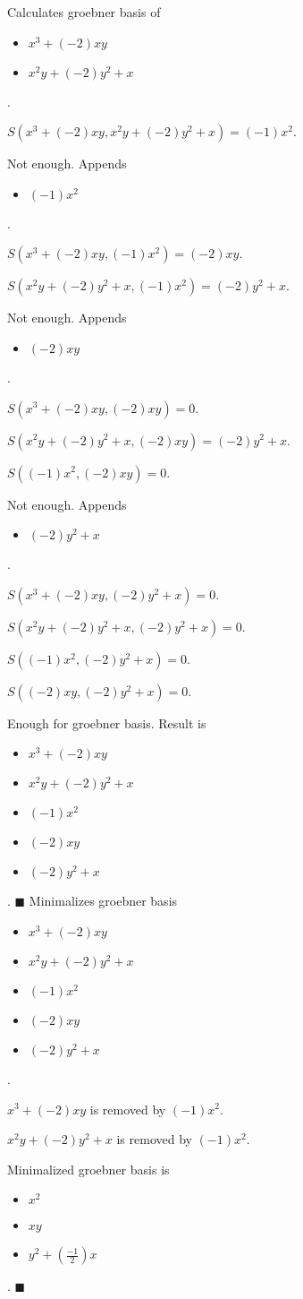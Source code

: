 \documentclass{jsarticle}
\begin{document}
Calculates groebner basis of 
\begin{itemize}
\item $x^{3}+(-2)xy$
\item $x^{2}y+(-2)y^{2}+x$
\end{itemize}  . 


$S(x^{3}+(-2)xy, x^{2}y+(-2)y^{2}+x) = (-1)x^{2}$.  

Not enough.  Appends \begin{itemize}
\item $(-1)x^{2}$
\end{itemize}  . 


$S(x^{3}+(-2)xy, (-1)x^{2}) = (-2)xy$.  

$S(x^{2}y+(-2)y^{2}+x, (-1)x^{2}) = (-2)y^{2}+x$.  

Not enough.  Appends \begin{itemize}
\item $(-2)xy$
\end{itemize}  . 


$S(x^{3}+(-2)xy, (-2)xy) = 0$.  

$S(x^{2}y+(-2)y^{2}+x, (-2)xy) = (-2)y^{2}+x$.  

$S((-1)x^{2}, (-2)xy) = 0$.  

Not enough.  Appends \begin{itemize}
\item $(-2)y^{2}+x$
\end{itemize}  . 


$S(x^{3}+(-2)xy, (-2)y^{2}+x) = 0$.  

$S(x^{2}y+(-2)y^{2}+x, (-2)y^{2}+x) = 0$.  

$S((-1)x^{2}, (-2)y^{2}+x) = 0$.  

$S((-2)xy, (-2)y^{2}+x) = 0$.  

Enough for groebner basis.  Result is \begin{itemize}
\item $x^{3}+(-2)xy$
\item $x^{2}y+(-2)y^{2}+x$
\item $(-1)x^{2}$
\item $(-2)xy$
\item $(-2)y^{2}+x$
\end{itemize}  . 
$\blacksquare{}$
Minimalizes groebner basis 
\begin{itemize}
\item $x^{3}+(-2)xy$
\item $x^{2}y+(-2)y^{2}+x$
\item $(-1)x^{2}$
\item $(-2)xy$
\item $(-2)y^{2}+x$
\end{itemize}  . 


$x^{3}+(-2)xy$ is removed by $(-1)x^{2}$.  

$x^{2}y+(-2)y^{2}+x$ is removed by $(-1)x^{2}$.  

Minimalized groebner basis is 
\begin{itemize}
\item $x^{2}$
\item $xy$
\item $y^{2}+(\frac{-1}{2})x$
\end{itemize}  . 
$\blacksquare{}$
\end{document}
